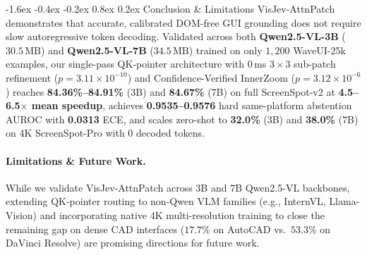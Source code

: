 \documentclass[10pt,twocolumn,letterpaper]{article}
\makeatletter
\renewcommand\section{\@startsection{section}{1}{\z@}%
  {-1.6ex \@plus -0.4ex \@minus -0.2ex}%
  {0.8ex \@plus 0.2ex}%
  {\normalfont\large\bfseries\color{navy}}}
\makeatother
\begin{document}
\section{Conclusion \& Limitations}
\label{sec:conclusion}
VisJev-AttnPatch demonstrates that accurate, calibrated DOM-free GUI grounding does not require slow autoregressive token decoding. Validated across both \textbf{Qwen2.5-VL-3B} ($30.5\,\text{MB}$) and \textbf{Qwen2.5-VL-7B} ($34.5\,\text{MB}$) trained on only $1{,}200$ WaveUI-25k examples, our single-pass QK-pointer architecture with $0$\,ms $3{\times}3$ sub-patch refinement ($p{=}3.11{\times}10^{-10}$) and Confidence-Verified InnerZoom ($p{=}3.12{\times}10^{-6}$) reaches \textbf{84.36\%--84.91\%} (3B) and \textbf{84.67\%} (7B) on full ScreenSpot-v2 at \textbf{4.5--6.5$\times$ mean speedup}, achieves \textbf{0.9535--0.9576} hard same-platform abstention AUROC with \textbf{0.0313} ECE, and scales zero-shot to \textbf{32.0\%} (3B) and \textbf{38.0\%} (7B) on 4K ScreenSpot-Pro with $0$ decoded tokens.

\paragraph{Limitations \& Future Work.}
While we validate VisJev-AttnPatch across 3B and 7B Qwen2.5-VL backbones, extending QK-pointer routing to non-Qwen VLM families (e.g., InternVL, Llama-Vision) and incorporating native 4K multi-resolution training to close the remaining gap on dense CAD interfaces ($17.7\%$ on AutoCAD vs.\ $53.3\%$ on DaVinci Resolve) are promising directions for future work.
\end{document}

